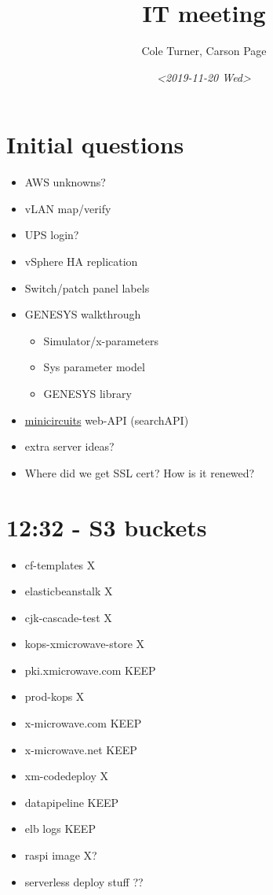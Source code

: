 \documentclass[11pt]{article}
\author{Cole Turner, Carson Page}
\date{\textit{<2019-11-20 Wed>}}
\title{IT meeting}
\begin{document}
\maketitle
\tableofcontents


\section*{Initial questions}
\label{sec:org799ee5b}
\begin{itemize}
\item AWS unknowns?
\item vLAN map/verify
\item UPS login?
\item vSphere HA replication
\item Switch/patch panel labels
\item GENESYS walkthrough
\begin{itemize}
\item Simulator/x-parameters
\item Sys parameter model
\item GENESYS library
\end{itemize}
\item \href{https://www.minicircuits.com/WebStore/x\_mwblock.html}{minicircuits} web-API (searchAPI)
\item extra server ideas?
\item Where did we get SSL cert? How is it renewed?
\end{itemize}

\section*{12:32 - S3 buckets}
\label{sec:org98f56f9}
\begin{itemize}
\item cf-templates X
\item elasticbeanstalk X
\item cjk-cascade-test X
\item kops-xmicrowave-store X
\item pki.xmicrowave.com KEEP
\item prod-kops X
\item x-microwave.com KEEP
\item x-microwave.net KEEP
\item xm-codedeploy X
\item datapipeline KEEP
\item elb logs KEEP
\item raspi image X?
\item serverless deploy stuff ??
\end{itemize}
\end{document}
